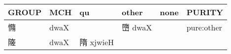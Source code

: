 \documentclass[14pt,a4paper]{scrartcl}
\begin{document}
\begin{longtable}[c]{@{}llllll@{}}
\toprule
\begin{minipage}[b]{0.14\columnwidth}\raggedright\strut
GROUP
\strut\end{minipage} &
\begin{minipage}[b]{0.14\columnwidth}\raggedright\strut
MCH
\strut\end{minipage} &
\begin{minipage}[b]{0.14\columnwidth}\raggedright\strut
qu
\strut\end{minipage} &
\begin{minipage}[b]{0.14\columnwidth}\raggedright\strut
other
\strut\end{minipage} &
\begin{minipage}[b]{0.14\columnwidth}\raggedright\strut
none
\strut\end{minipage} &
\begin{minipage}[b]{0.14\columnwidth}\raggedright\strut
PURITY
\strut\end{minipage}\tabularnewline
\midrule
\endhead
\begin{minipage}[t]{0.14\columnwidth}\raggedright\strut
憜
\strut\end{minipage} &
\begin{minipage}[t]{0.14\columnwidth}\raggedright\strut
dwaX
\strut\end{minipage} &
\begin{minipage}[t]{0.14\columnwidth}\raggedright\strut
\strut\end{minipage} &
\begin{minipage}[t]{0.14\columnwidth}\raggedright\strut
嶞 dwaX
\strut\end{minipage} &
\begin{minipage}[t]{0.14\columnwidth}\raggedright\strut
\strut\end{minipage} &
\begin{minipage}[t]{0.14\columnwidth}\raggedright\strut
pure:other
\strut\end{minipage}\tabularnewline
\begin{minipage}[t]{0.14\columnwidth}\raggedright\strut
隓
\strut\end{minipage} &
\begin{minipage}[t]{0.14\columnwidth}\raggedright\strut
dwaX
\strut\end{minipage} &
\begin{minipage}[t]{0.14\columnwidth}\raggedright\strut
隋 xjwieH
\strut\end{minipage} &
\begin{minipage}[t]{0.14\columnwidth}\raggedright\strut

\end{minipage}
\end{longtable}
\end{document}
